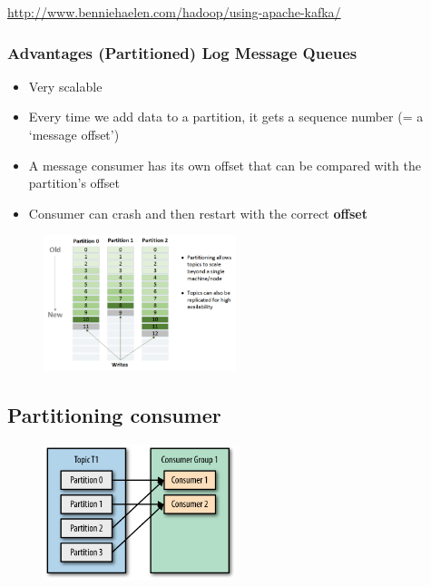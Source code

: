 \documentclass{article}
\begin{document}
\url{http://www.benniehaelen.com/hadoop/using-apache-kafka/}


\subsubsection{Advantages (Partitioned) Log Message Queues}

\begin{itemize}
    \item Very scalable
    \item Every time we add data to a partition, it gets a sequence number (= a `message offset')
    \item A message consumer has its own offset that can be compared with the partition's offset
    \item Consumer can crash and then restart with the correct \textbf{offset}
\end{itemize}

\begin{figure}[H]
    \centering
    \includegraphics[width=0.5\textwidth]{log-advantages.png}
\end{figure}

\subsection{Partitioning consumer}

\begin{figure}[H]
    \centering
    \includegraphics[width=0.5\textwidth]{partitioning-consumer.png}
\end{figure}
\end{document}
